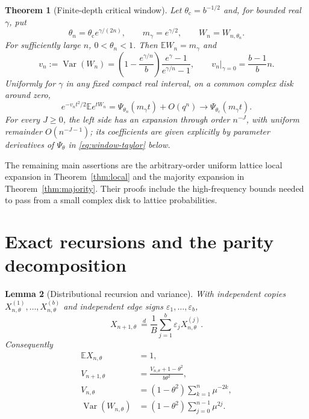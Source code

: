 \documentclass[11pt]{article}
\newtheorem{theorem}{Theorem}[section]
\newtheorem{lemma}[theorem]{Lemma}
\theoremstyle{definition}
\newcommand{\E}{\mathbb E}
\newcommand{\Var}{\operatorname{Var}}
\newcommand{\crit}{\theta_{\mathrm c}}
\begin{document}
\begin{theorem}[Finite-depth critical window]\label{thm:window}
Let $\crit=b^{-1/2}$ and, for bounded real $\gamma$, put
\begin{equation}\label{eq:window}
 \theta_n=\crit e^{\gamma/(2n)},\qquad
 m_\gamma=e^{\gamma/2},\qquad W_n=W_{n,\theta_n}.
\end{equation}
For sufficiently large $n$, $0<\theta_n<1$. Then
$\E W_n=m_\gamma$ and
\begin{equation}\label{eq:window-variance}
 v_n:=\Var(W_n)
 =\left(1-\frac{e^{\gamma/n}}b\right)
          \frac{e^\gamma-1}{e^{\gamma/n}-1},
 \qquad v_n\big|_{\gamma=0}=\frac{b-1}{b}n.
\end{equation}
Uniformly for $\gamma$ in any fixed compact real interval, on a common
complex disk around zero,
\begin{equation}\label{eq:window-residue}
 e^{-v_nt^2/2}\E e^{tW_n}
      =\Psi_{\theta_n}(m_\gamma t)+O(q^n)
      \longrightarrow\Psi_{\crit}(m_\gamma t).
\end{equation}
For every $J\geq0$, the left side has an expansion through order
$n^{-J}$, with uniform remainder $O(n^{-J-1})$; its coefficients are
given explicitly by parameter derivatives of $\Psi_\theta$ in
\eqref{eq:window-taylor} below.
\end{theorem}

The remaining main assertions are the arbitrary-order uniform lattice
local expansion in Theorem~\ref{thm:local} and the majority expansion in
Theorem~\ref{thm:majority}. Their proofs include the high-frequency bounds
needed to pass from a small complex disk to lattice probabilities.

\section{Exact recursions and the parity decomposition}

\begin{lemma}[Distributional recursion and variance]\label{lem:recursion}
With independent copies $X_{n,\theta}^{(1)},\ldots,X_{n,\theta}^{(b)}$
and independent edge signs $\varepsilon_1,\ldots,\varepsilon_b$,
\begin{equation}\label{eq:distributional}
 X_{n+1,\theta}\ \overset{d}{=}
       \frac1B\sum_{j=1}^b\varepsilon_jX_{n,\theta}^{(j)}.
\end{equation}
Consequently
\begin{align}
 \E X_{n,\theta}&=1,\label{eq:mean}\\
 V_{n+1,\theta}&=\frac{V_{n,\theta}+1-\theta^2}{b\theta^2},\label{eq:variance-rec}\\
 V_{n,\theta}&=(1-\theta^2)\sum_{k=1}^n\mu^{-2k},\label{eq:variance-X}\\
 \Var(W_{n,\theta})&=(1-\theta^2)\sum_{j=0}^{n-1}\mu^{2j}.\label{eq:variance-W}
\end{align}
\end{lemma}
\end{document}
